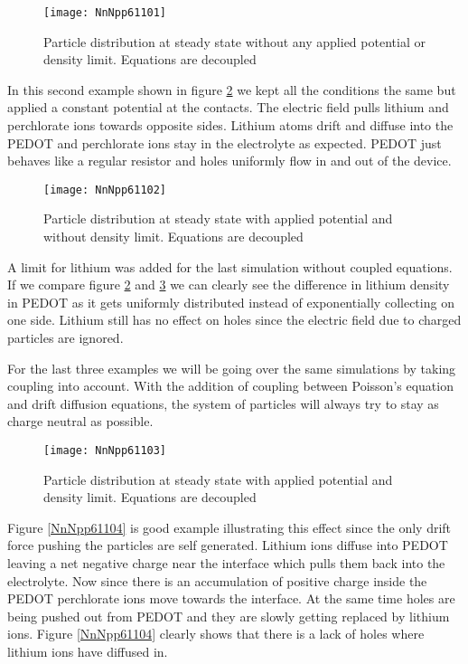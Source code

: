 \begin{figure}[!htp]
\centering
\texttt{[image: NnNpp61101]}
\caption{Particle distribution at steady state without any applied potential or density limit. Equations are decoupled} 
\label{NnNpp61101}
\end{figure}

In this second example shown in figure \ref{NnNpp61102} we kept all the conditions the same but applied a constant potential at the contacts. The electric field pulls lithium and perchlorate ions towards opposite sides. Lithium atoms drift and diffuse into the PEDOT and perchlorate ions stay in the electrolyte as expected. PEDOT just behaves like a regular resistor and holes uniformly flow in and out of the device.

\begin{figure}[!htp]
\centering
\texttt{[image: NnNpp61102]}
\caption{Particle distribution at steady state with applied potential and without density limit. Equations are decoupled} 
\label{NnNpp61102}
\end{figure}

A limit for lithium was added for the last simulation without coupled equations. If we compare figure \ref{NnNpp61102} and \ref{NnNpp61103} we can clearly see the difference in lithium density in PEDOT as it gets uniformly distributed instead of exponentially collecting on one side. Lithium still has no effect on holes since the electric field due to charged particles are ignored.

For the last three examples we will be going over the same simulations by taking coupling into account. With the addition of coupling between Poisson's equation and drift diffusion equations, the system of particles will always try to stay as charge neutral as possible. 

 
\begin{figure}[!htp]
\centering
\texttt{[image: NnNpp61103]}
\caption{Particle distribution at steady state with applied potential and density limit. Equations are decoupled} 
\label{NnNpp61103}
\end{figure}

Figure \ref{NnNpp61104} is good example illustrating this effect since the only drift force pushing the particles are self generated. Lithium ions diffuse into PEDOT leaving a net negative charge near the interface which pulls them back into the electrolyte. Now since there is an accumulation of positive charge inside the PEDOT perchlorate ions move towards the interface. At the same time holes are being pushed out from PEDOT and they are slowly getting replaced by lithium ions. Figure \ref{NnNpp61104} clearly shows that there is a lack of holes where lithium ions have diffused in.

